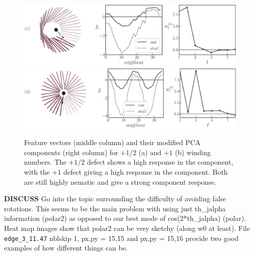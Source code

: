 \begin{figure}[!t]
\centering
\begin{minipage}[c]{\columnwidth}
	\centering
	\includegraphics[width=\columnwidth]{./figs/prob_stats_plushalf_small_0.eps}\\
	\vspace{0.5cm}
	\includegraphics[width=\columnwidth]{./figs/prob_stats_plusone_small_0.eps}
\end{minipage}%
\caption{Feature vectors (middle column) and their modified PCA components (right column) for $+1/2$ (a) and $+1$ (b) winding numbers. The $+1/2$ defect shows a high response in the  component, with the $+1$ defect giving a high response in the  component. Both are still highly nematic and give a strong  component response.
}
\label{FIG:prob_samples2}
\end{figure}




\textbf{DISCUSS} Go into the topic surrounding the difficulty of avoiding false rotations. This seems to be the main problem with using just th\_jalpha information (polar2) as opposed to our best mode of cos(2*th\_jalpha) (polar). Heat map images show that polar2 can be very sketchy (along w0 at least). File \texttt{edge\_3\_11.47} nblskip 1, px,py = 15,15 and px,py = 15,16 provide two good examples of how different things can be.


